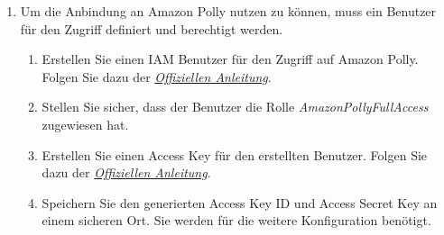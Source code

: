 \begin{enumerate}
    \item Um die Anbindung an Amazon Polly nutzen zu können, muss ein Benutzer für den Zugriff definiert und berechtigt werden.
    \begin{enumerate}
        \item Erstellen Sie einen IAM Benutzer für den Zugriff auf Amazon Polly. Folgen Sie dazu der \href{https://aws.amazon.com/premiumsupport/knowledge-center/create-access-key/}{\textit{Offiziellen Anleitung}}.
        \item Stellen Sie sicher, dass der Benutzer die Rolle \textit{AmazonPollyFullAccess} zugewiesen hat.
        \item Erstellen Sie einen Access Key für den erstellten Benutzer. Folgen Sie dazu der \href{https://aws.amazon.com/premiumsupport/knowledge-center/create-access-key/}{\textit{Offiziellen Anleitung}}.
        \item Speichern Sie den generierten Access Key ID und Access Secret Key an einem sicheren Ort. Sie werden für die weitere Konfiguration benötigt.
    \end{enumerate}


\end{enumerate}
